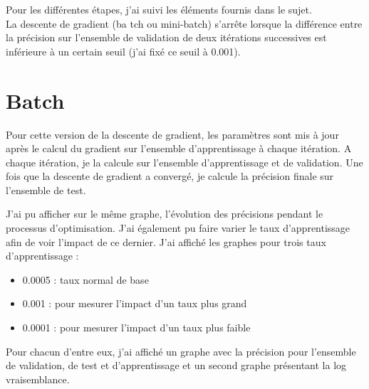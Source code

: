 \documentclass[12pt]{article}
\begin{document}
Pour les différentes étapes, j'ai suivi les éléments fournis dans le sujet. \\
La descente de gradient (ba	tch ou mini-batch) s'arrête lorsque la différence entre la précision sur l'ensemble de validation de deux itérations successives est inférieure à un certain seuil (j'ai fixé ce seuil à 0.001).

\section{Batch}
Pour cette version de la descente de gradient, les paramètres sont mis à jour après le calcul du gradient sur l'ensemble d'apprentissage à chaque itération.
A chaque itération, je la calcule sur l'ensemble d'apprentissage et de validation. Une fois que la descente de gradient a convergé, je calcule la précision finale sur l'ensemble de test.

J'ai pu afficher sur le même graphe, l'évolution des précisions pendant le processus d'optimisation. J'ai également pu faire varier le taux d'apprentissage afin de voir l'impact de ce dernier.
J'ai affiché les graphes pour trois taux d'apprentissage : 
\begin{itemize}
\item 0.0005 : taux normal de base
\item 0.001 : pour mesurer l'impact d'un taux plus grand
\item 0.0001 : pour mesurer l'impact d'un taux plus faible
\end{itemize}
Pour chacun d'entre eux, j'ai affiché un graphe avec la précision pour l'ensemble de validation, de test et d'apprentissage et un second graphe présentant la log vraisemblance. 
\end{document}
